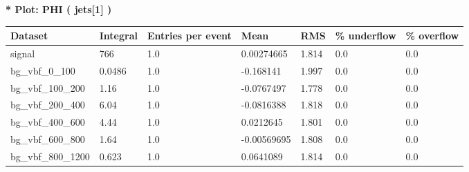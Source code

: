 \documentclass[a4paper, 10pt]{article}
\begin{document}
\textbf{* Plot: PHI ( jets[1] ) }\\
   \begin{table}[H]
  \begin{center}
    \begin{tabular}{|m{23.0mm}|m{23.0mm}|m{18.0mm}|m{19.0mm}|m{19.0mm}|m{19.0mm}|m{19.0mm}|}
      \hline
      {\cellcolor{yellow}         Dataset}& {\cellcolor{yellow}         Integral}& {\cellcolor{yellow}         Entries per event}& {\cellcolor{yellow}         Mean}& {\cellcolor{yellow}         RMS}& {\cellcolor{yellow}         \% underflow}& {\cellcolor{yellow}         \% overflow}\\
      \hline
      {\cellcolor{white}         signal}& {\cellcolor{white}         766}& {\cellcolor{white}         1.0}& {\cellcolor{white}         0.00274665}& {\cellcolor{white}         1.814}& {\cellcolor{green}         0.0}& {\cellcolor{green}         0.0}\\
      \hline
      {\cellcolor{white}         bg\_vbf\_0\_100}& {\cellcolor{white}         0.0486}& {\cellcolor{white}         1.0}& {\cellcolor{white}         -0.168141}& {\cellcolor{white}         1.997}& {\cellcolor{green}         0.0}& {\cellcolor{green}         0.0}\\
      \hline
      {\cellcolor{white}         bg\_vbf\_100\_200}& {\cellcolor{white}         1.16}& {\cellcolor{white}         1.0}& {\cellcolor{white}         -0.0767497}& {\cellcolor{white}         1.778}& {\cellcolor{green}         0.0}& {\cellcolor{green}         0.0}\\
      \hline
      {\cellcolor{white}         bg\_vbf\_200\_400}& {\cellcolor{white}         6.04}& {\cellcolor{white}         1.0}& {\cellcolor{white}         -0.0816388}& {\cellcolor{white}         1.818}& {\cellcolor{green}         0.0}& {\cellcolor{green}         0.0}\\
      \hline
      {\cellcolor{white}         bg\_vbf\_400\_600}& {\cellcolor{white}         4.44}& {\cellcolor{white}         1.0}& {\cellcolor{white}         0.0212645}& {\cellcolor{white}         1.801}& {\cellcolor{green}         0.0}& {\cellcolor{green}         0.0}\\
      \hline
      {\cellcolor{white}         bg\_vbf\_600\_800}& {\cellcolor{white}         1.64}& {\cellcolor{white}         1.0}& {\cellcolor{white}         -0.00569695}& {\cellcolor{white}         1.808}& {\cellcolor{green}         0.0}& {\cellcolor{green}         0.0}\\
      \hline
      {\cellcolor{white}         bg\_vbf\_800\_1200}& {\cellcolor{white}         0.623}& {\cellcolor{white}         1.0}& {\cellcolor{white}         0.0641089}& {\cellcolor{white}         1.814}& {\cellcolor{green}         0.0}& {\cellcolor{green}         0.0}\\

\end{tabular}
\end{center}
\end{table}
\end{document}
